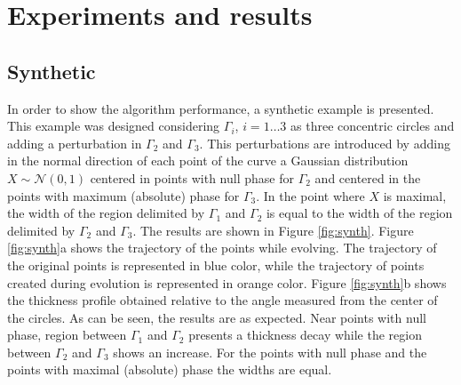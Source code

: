 \documentclass{article}
\begin{document}
\section{Experiments and results}
\label{sec:results}
\subsection{Synthetic}
\label{ssec:syn}
In order to show the algorithm performance, a synthetic example is presented. This example was designed considering $\Gamma_i$, $i=1\dots3$ as three concentric circles and adding a perturbation in $\Gamma_2$ and $\Gamma_3$. This perturbations are introduced by adding in the normal direction of each point of the curve a Gaussian distribution $X \sim \mathcal{N}(0,1)$ centered in points with null phase for $\Gamma_2$ and centered in the points with maximum (absolute) phase for $\Gamma_3$. In the point where $X$ is maximal, the width of the region delimited by $\Gamma_1$ and $\Gamma_2$ is equal to the width of the region delimited by $\Gamma_2$ and $\Gamma_3$. The results are shown in Figure \ref{fig:synth}. Figure \ref{fig:synth}a shows the trajectory of the points while evolving. The trajectory of the original points is represented in blue color, while the trajectory of points created during evolution is represented in orange color. Figure \ref{fig:synth}b shows the thickness profile obtained relative to the angle measured from the center of the circles. As can be seen, the results are as expected. Near points with null phase, region between $\Gamma_1$ and $\Gamma_2$ presents a thickness decay while the region between $\Gamma_2$ and $\Gamma_3$ shows an increase. For the points with null phase and the points with maximal (absolute) phase the widths are equal. 
\end{document}
